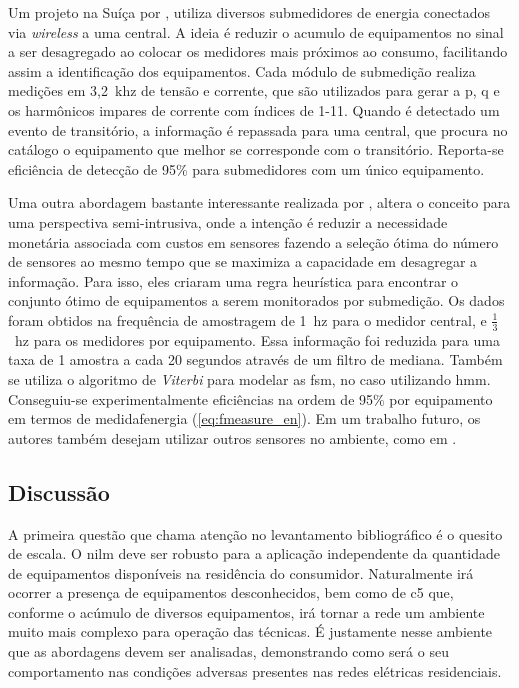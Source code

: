 Um projeto na Suíça por \cite{seminilm_ihome_tomek_2012}, utiliza
diversos submedidores de energia conectados via \emph{wireless} a uma
central. A ideia é reduzir o acumulo de equipamentos no sinal a ser
desagregado ao colocar os medidores mais próximos ao consumo,
facilitando assim a identificação dos equipamentos. Cada módulo de
submedição realiza medições em 3,2~k\acs{hz} de tensão e corrente, que
são utilizados para gerar a \acl{p}, \acl{q} e os harmônicos impares
de corrente com índices de 1-11. Quando é detectado um evento de
transitório, a informação é repassada para uma central, que procura no
catálogo o equipamento que melhor se corresponde com o transitório.
Reporta-se eficiência de detecção de 95\% para submedidores com um
único equipamento. 

Uma outra abordagem bastante interessante realizada por
\citet*{seminilm_fhmm_empiricalnmeter_2013}, altera o conceito
para uma perspectiva semi-intrusiva, onde a intenção é
reduzir a necessidade monetária associada com custos em
sensores fazendo a seleção ótima do número de sensores ao mesmo tempo
que se maximiza a capacidade em desagregar a informação. Para isso,
eles criaram uma regra heurística para encontrar o conjunto ótimo de
equipamentos a serem monitorados por submedição. Os dados foram obtidos
na frequência de amostragem de 1~\acs{hz} para o medidor central,
e $\frac{1}{3}$~\acs{hz} para os medidores por equipamento. Essa
informação foi reduzida para uma taxa de 1 amostra a cada 20 segundos
através de um filtro de mediana. Também se utiliza o
algoritmo de \emph{Viterbi} para modelar as \gls{fsm}, no caso
utilizando \gls{hmm}. Conseguiu-se experimentalmente eficiências na
ordem de 95\% por equipamento em termos de \acs{medidafenergia}
(\ref{eq:fmeasure_en}). Em um trabalho futuro, os autores também
desejam utilizar outros sensores no ambiente, como em
\cite{seminilm_berges_multisensor_2010}.

\subsection{Discussão}
\label{ssec:nilm_discussao}

A primeira questão que chama atenção no levantamento bibliográfico é o
quesito de escala. O \gls{nilm} deve ser robusto para a aplicação
independente da quantidade de equipamentos disponíveis na residência do
consumidor. Naturalmente irá ocorrer a presença de equipamentos
desconhecidos, bem como de \gls{c5} que, conforme o acúmulo de
diversos equipamentos, irá tornar a rede um ambiente muito mais complexo
para operação das técnicas. É justamente nesse ambiente que as
abordagens devem ser analisadas, demonstrando como será o seu
comportamento nas condições adversas presentes nas redes elétricas
residenciais.

